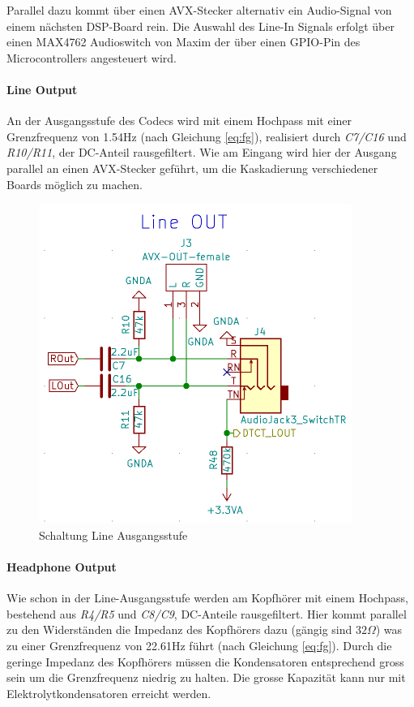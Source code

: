 Parallel dazu kommt über einen AVX-Stecker alternativ ein Audio-Signal von einem nächsten DSP-Board rein. Die Auswahl des Line-In Signals erfolgt über einen MAX4762 \cite{max4762} Audioswitch von Maxim der über einen GPIO-Pin des Microcontrollers angesteuert wird. 

\paragraph{Line Output}
\label{par:LineOUT}
An der Ausgangsstufe des Codecs wird mit einem Hochpass mit einer Grenzfrequenz von 1.54Hz (nach Gleichung \ref{eq:fg}), realisiert durch \textit{C7/C16} und \textit{R10/R11}, der DC-Anteil rausgefiltert. Wie am Eingang wird hier der Ausgang parallel an einen AVX-Stecker geführt, um die Kaskadierung verschiedener Boards möglich zu machen.


\begin{figure} [H]
\begin{center}
 \includegraphics[scale=0.5]{../graphics/Schema_LineOUT.png}
\caption{Schaltung Line Ausgangsstufe}
\label{fig:Schema_LineOUT}
\end{center}
\end{figure}


\paragraph{Headphone Output}
\label{par:HPOUT}
Wie schon in der Line-Ausgangsstufe werden am Kopfhörer mit einem Hochpass, bestehend aus \textit{R4/R5} und \textit{C8/C9}, DC-Anteile rausgefiltert. Hier kommt parallel zu den Widerständen die Impedanz des Kopfhörers dazu (gängig sind $32\Omega$) was zu einer Grenzfrequenz von 22.61Hz führt (nach Gleichung \ref{eq:fg}). Durch die geringe Impedanz des Kopfhörers müssen die Kondensatoren entsprechend gross sein um die Grenzfrequenz niedrig zu halten. Die grosse Kapazität kann nur mit Elektrolytkondensatoren erreicht werden.

